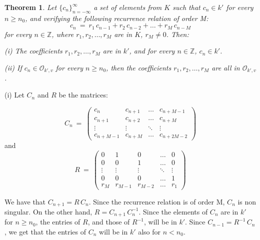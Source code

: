\documentclass[12pt]{report} %
\newtheorem{thm}{Theorem}[section]
\theoremstyle{definition}
\theoremstyle{remark}
\begin{document}
\begin{thm} \label{l:req}
Let $\{c_n\}_{n=-\infty}^{\infty}$ a set of 
elements from $K$ such that $c_n \in k'$ for every 
$n \geq n_0$, and verifying the following recurrence 
relation of order M:
\begin{equation}
c_n\ =\ r_1\,c_{n-1} + r_2\,c_{n-2} + \dots + r_M\,c_{n-M}
\end{equation}
for every $n \in \mathbb Z$, where $r_1,r_2,\dots,r_M$ are in 
$K$, $r_M \neq 0$. 
Then:

\item{(i)} The coefficients $r_1,r_2,\dots,r_M$ are in 
$k'$, and for every $n \in \mathbb Z$, $c_n \in k'$.

\item{(ii)} If $c_n \in \mathcal O_{k',v}$ 
for every $n \geq n_0$, then the coefficients 
$r_1,r_2,\dots,r_M$ are all in 
$\mathcal O_{k',v}$.

\end{thm}


\proof 

\item{(i)} Let $C_n$ and $R$ be the matrices:

\begin{equation}
C_n\ =
\ \left(
\begin{array}{llll}
              c_n & c_{n+1} & \hdots & c_{n+M-1} \\
              c_{n+1} & c_{n+2} & \hdots  & c_{n+M} \\
              \vdots & \vdots & \ddots & \vdots \\
              c_{n+M-1} & c_{n+M} & \hdots & c_{n+2M-2}
\end{array}
\right)
\end{equation}
and
\begin{equation}
R\ =
\ \left(
\begin{array}{lllll}
              0 & 1 & 0 & \hdots & 0 \\
              0 & 0 & 1 & \hdots & 0 \\
             \vdots & \vdots & \vdots & \ddots & \vdots \\
              0 & 0 & 0 & \hdots & 1 \\
              r_M & r_{M-1} & r_{M-2} & \hdots & r_1 
\end{array}
\right)
\end{equation} 

We have that $C_{n+1} = R\,C_n$. Since the recurrence 
relation is of order M, $C_n$ is non singular. 
On the other hand, $R = C_{n+1}\,C_{n}^{-1}$. Since the 
elements of $C_n$ are in $k'$ for $n \geq n_0$, the entries 
of $R$, and those of $R^{-1}$, will be in $k'$. Since 
$C_{n-1} = R^{-1}\,C_n$, we get that the entries of 
$C_n$ will be in $k'$ also for $n < n_0$. 
\end{document}
